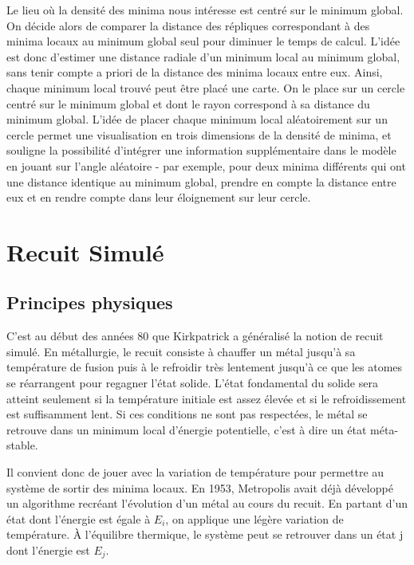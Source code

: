 \documentclass{article}%
\begin{document}
      Le lieu où la densité des minima nous intéresse est centré sur le minimum global.  On décide alors de comparer la distance des répliques correspondant à des minima locaux au minimum global seul pour diminuer le temps de calcul.
      L’idée est donc d’estimer une distance radiale d’un minimum local au minimum global, sans tenir compte a priori de la distance des minima locaux entre eux. Ainsi, chaque minimum local trouvé peut être placé une carte. On le place sur un cercle centré sur le minimum global et dont le rayon correspond à sa distance du minimum global.
      L’idée de placer chaque minimum local aléatoirement sur un cercle permet une visualisation en trois dimensions de la densité de minima, et souligne la possibilité d’intégrer une information supplémentaire dans le modèle en jouant sur l’angle aléatoire - par exemple, pour deux minima différents qui ont une distance identique au minimum global, prendre en compte la distance entre eux et en rendre compte dans leur éloignement sur leur cercle.

\clearpage

\section{Recuit Simulé}

\subsection{Principes physiques}

	C'est au début des années 80 que Kirkpatrick a généralisé la notion de recuit simulé. En métallurgie, le recuit consiste à chauffer un métal jusqu'à sa température de fusion puis à le refroidir très lentement jusqu'à ce que les atomes se réarrangent pour regagner l'état solide. L'état fondamental du solide sera atteint seulement si la température initiale est assez élevée et si le refroidissement est suffisamment lent. Si ces conditions ne sont pas respectées, le métal se retrouve dans un minimum local d'énergie potentielle, c'est à dire un état méta-stable.
	
	Il convient donc de jouer avec la variation de température pour permettre au système de sortir des minima locaux. En 1953, Metropolis avait déjà développé un algorithme recréant l'évolution d'un métal au cours du recuit. En partant d'un état dont l'énergie est égale à $E_i$, on applique une légère variation de température. À l'équilibre thermique, le système peut se retrouver dans un état j dont l'énergie est $E_j$.
	
\end{document}
